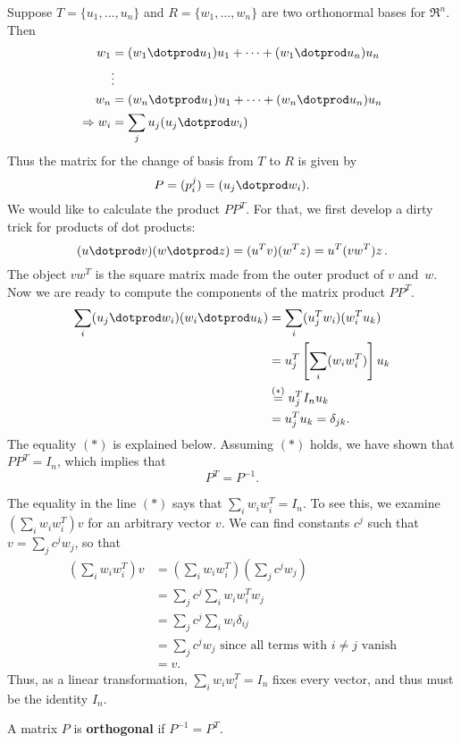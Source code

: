 Suppose $T=\{u_1, \ldots, u_n \}$ and $R=\{w_1, \ldots, w_n \}$ are two orthonormal bases for $\Re^n$.  Then\\[3mm]
\begin{align*}
w_1 &= (w_1\dotprod u_1) u_1 + \cdots + (w_1\dotprod u_n)u_n\\
 & \vdots \\
w_n &= (w_n\dotprod u_1) u_1 + \cdots + (w_n\dotprod u_n)u_n\\
\Rightarrow w_i &= \sum_j u_j(u_j\dotprod w_i)
\end{align*}
Thus the matrix for the change of basis from $T$ to $R$ is given by 
\[
P = (p^j_i) = (u_j\dotprod w_i).
\]
We would like to calculate the product $PP^T$. For that, we first develop a dirty trick for products of dot products:
\[
(u\dotprod v)(w\dotprod z)=(u^T v) (w^T z) = u^T (v w^T) z\, . 
\]
The object $v w^T$ is the square matrix made from the outer product of $v$ and~$w$. 
Now we are ready to compute the components of the matrix product $PP^T$.
\begin{align*}
\sum_i(u_j\dotprod w_i)(w_i\dotprod u_k)&=
 \sum_i(u_j^T w_i) (w_i^T u_k)\\
&= u_j^T \left[\sum_i (w_i w_i^T) \right] u_k \\
&\stackrel{(*)}= u_j^T I_n u_k \\\
&= u_j^T u_k = \delta_{jk}.
\end{align*}
The equality $(*)$ is explained below.  Assuming $(*)$ holds, we have shown that $PP^T=I_n$, which implies that 
\[
P^T=P^{-1}.
\]

The equality in the line $(*)$ says that $\sum_i w_i w_i^T=I_n$.  To see this, we examine $\left(\sum_i w_i w_i^T\right)v$ for an arbitrary vector $v$.  We can find constants $c^j$ such that $v=\sum_j c^jw_j$, so that
\begin{align*}
\left(\sum_i w_i w_i^T\right)v
&= \left(\sum_i w_i w_i^T\right)\left(\sum_j c^jw_j\right) \\
&= \sum_j c^j \sum_i w_i w_i^T w_j \\
&= \sum_j c^j \sum_i w_i \delta_{ij} \\
&= \sum_j c^j w_j \text{ since all terms with $i\neq j$ vanish}\\
&=v.
\end{align*}
Thus, as a linear transformation, $\sum_i w_i w_i^T=I_n$ fixes every vector, and thus must be the identity $I_n$.

\begin{definition}
A matrix $P$ is {\bfseries orthogonal} if $P^{-1}=P^T$.
\end{definition}

